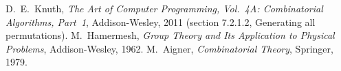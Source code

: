  D.~E.~Knuth, \emph{The Art of Computer Programming, Vol.~4A: Combinatorial Algorithms, Part~1}, Addison-Wesley, 2011 (section 7.2.1.2, Generating all permutations).
 M.~Hamermesh, \emph{Group Theory and Its Application to Physical Problems}, Addison-Wesley, 1962.
 M.~Aigner, \emph{Combinatorial Theory}, Springer, 1979.
